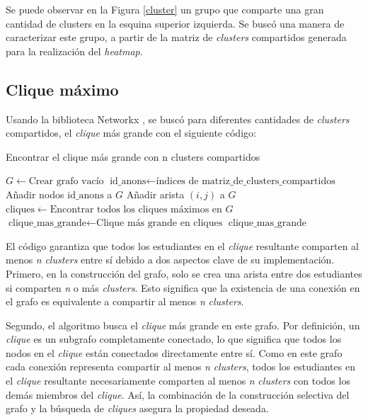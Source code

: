 \documentclass[11pt,a4paper,twoside,openany]{tesis}
\begin{document}
Se puede observar en la Figura \ref{cluster} un grupo que comparte una gran cantidad de clusters en la esquina superior izquierda. Se buscó una manera de caracterizar este grupo, a partir de la matriz de \emph{clusters} compartidos generada para la realización del \emph{heatmap}.  





\subsection{Clique máximo}\textbf{ }
Usando la biblioteca Networkx \cite{networkx}, se buscó para diferentes cantidades de \emph{clusters} compartidos, el \emph{clique} más grande con el siguiente código:


\begin{algorithm}[H]
\caption{Encontrar el clique más grande con n clusters compartidos}
\begin{algorithmic}[1]
    \State $G \gets \text{Crear grafo vacío}$
    \State $\text{id\_anons} \gets \text{índices de matriz\_de\_clusters\_compartidos}$
    \State Añadir nodos $\text{id\_anons}$ a $G$
            \State Añadir arista $(i, j)$ a $G$
        \EndIf
    \EndFor
    \State $\text{cliques} \gets \text{Encontrar todos los cliques máximos en } G$
    \State $\text{clique\_mas\_grande} \gets \text{Clique más grande en cliques}$
    \State \Return $\text{clique\_mas\_grande}$
\EndFunction
\end{algorithmic}
\end{algorithm}

El código garantiza que todos los estudiantes en el \emph{clique} resultante comparten al menos \emph{n} \emph{clusters} entre sí debido a dos aspectos clave de su implementación. Primero, en la construcción del grafo, solo se crea una arista entre dos estudiantes si comparten \emph{n} o más \emph{clusters}. Esto significa que la existencia de una conexión en el grafo es equivalente a compartir al menos \emph{n} \emph{clusters}.

Segundo, el algoritmo busca el \emph{clique} más grande en este grafo. Por definición, un \emph{clique} es un subgrafo completamente conectado, lo que significa que todos los nodos en el \emph{clique} están conectados directamente entre sí. Como en este grafo cada conexión representa compartir al menos \emph{n} \emph{clusters}, todos los estudiantes en el \emph{clique} resultante necesariamente comparten al menos \emph{n} \emph{clusters} con todos los demás miembros del \emph{clique}. Así, la combinación de la construcción selectiva del grafo y la búsqueda de \emph{cliques} asegura la propiedad deseada.
\end{document}

